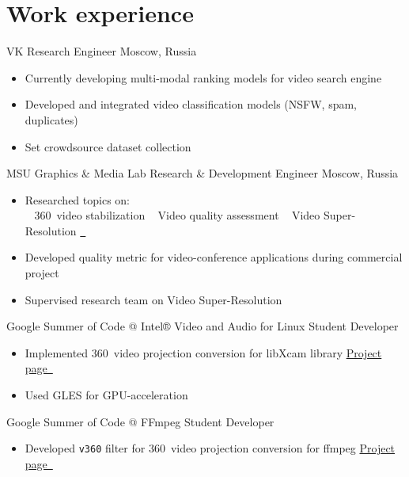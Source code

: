 \documentclass{tccv}
\newcommand{\sphere}{360\textdegree~}
\begin{document}
\section{Work experience}

\begin{eventlist}

     {VK}
     {Research Engineer}
     {Moscow, Russia}
\begin{itemize}
     \item Currently developing multi-modal ranking models for video search engine
     \item Developed and integrated video classification models (NSFW, spam, duplicates)
     \item Set crowdsource dataset collection
\end{itemize}

     {MSU Graphics \& Media Lab}
     {Research \& Development Engineer}
     {Moscow, Russia}
\begin{itemize}
     \item Researched topics on:\\
          \faAngleRight~ \sphere video stabilization\qquad
          \faAngleRight~ Video quality assessment\qquad
          \faAngleRight~ Video Super-Resolution \href{https://videoprocessing.ai/benchmarks/video-super-resolution.html}{~\faExternalLink*}
     \item Developed quality metric for video-conference applications during commercial project
     \item Supervised research team on Video Super-Resolution
\end{itemize}

     {Google Summer of Code @ Intel® Video and Audio for Linux}
     {Student Developer}
     {}
\begin{itemize}
     \item Implemented \sphere video projection conversion for libXcam library\hfill
     \href{https://unishift.github.io/project/2021-08-20-gsoc-libxcam}{Project page~\faExternalLink*}
     \item Used GLES for GPU-acceleration
\end{itemize}

     {Google Summer of Code @ FFmpeg}
     {Student Developer}
     {}
\begin{itemize}
     \item Developed \texttt{v360} filter for \sphere video projection conversion for ffmpeg\hfill
     \href{https://unishift.github.io/project/2019-08-26-gsoc-ffmpeg}{Project page~\faExternalLink*}
\end{itemize}

\end{eventlist}
\end{document}
